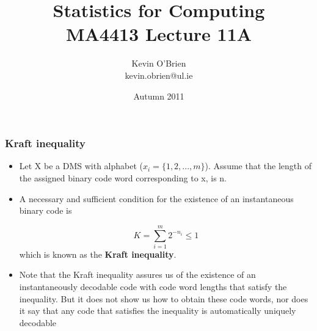 \documentclass[a4]{beamer}
\title[MA4413]{Statistics for Computing \\ {\normalsize MA4413 Lecture 11A}}
\author[Kevin O'Brien]{Kevin O'Brien \\ {\scriptsize kevin.obrien@ul.ie}}
\date{Autumn 2011}
\begin{document}
	\begin{frame}
	\frametitle{ Kraft inequality}
	\begin{itemize}
		\item Let X be a DMS with alphabet ($x _i = \{1, 2, . . . ,m\}$). Assume that the length of the assigned binary
		code word corresponding to x, is n.
		\item A necessary and sufficient condition for the existence of an instantaneous binary code is
		
		\[ K = \sum^{m}_{i=1}2^{-n_i} \leq 1 \]
		which is known as the \textbf{Kraft inequality}.
		\item Note that the Kraft inequality assures us of the existence of an instantaneously decodable code
		with code word lengths that satisfy the inequality. But it does not show us how to obtain these code
		words, nor does it say that any code that satisfies the inequality is automatically uniquely decodable
	\end{itemize}
\end{frame}
\end{document}
